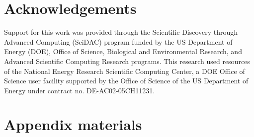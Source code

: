 \documentclass[tc, manuscript]{copernicus}
\begin{document}


\section{Acknowledgements}
Support for this work was provided through the Scientific Discovery through Advanced Computing (SciDAC) program funded by the US Department of Energy (DOE), Office of Science, Biological and Environmental Research, and Advanced Scientific Computing Research programs. This research used resources of the National Energy Research Scientific Computing Center, a DOE Office of Science user facility supported by the Office of Science of the US Department of Energy under contract no. DE-AC02-05CH11231.





\appendix

\section{Appendix materials}
\renewcommand{\thefigure}{A\arabic{figure}}
\setcounter{figure}{0}
\end{document}
